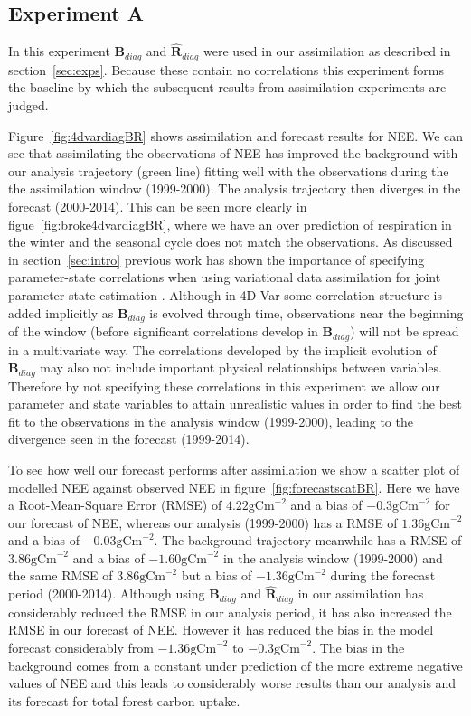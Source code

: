 \documentclass[11pt]{article}
\begin{document}
\subsection{Experiment A} \label{sec:expa}
In this experiment $\textbf{B}_{diag}$ and $\hat{\textbf{R}}_{diag}$ were used in our assimilation as described in section~\ref{sec:exps}. Because these contain no correlations this experiment forms the baseline by which the subsequent results from assimilation experiments are judged.  

Figure~\ref{fig:4dvardiagBR} shows assimilation and forecast results for NEE. We can see that assimilating the observations of NEE has improved the background with our analysis trajectory (green line) fitting well with the observations during the the assimilation window (1999-2000). The analysis trajectory then diverges in the forecast (2000-2014). This can be seen more clearly in figue~\ref{fig:broke4dvardiagBR}, where we have an over prediction of respiration in the winter and the seasonal cycle does not match the observations. As discussed in section~\ref{sec:intro} previous work has shown the importance of specifying parameter-state correlations when using variational data assimilation for joint parameter-state estimation \citep{smith2009variational}. Although in 4D-Var some correlation structure is added implicitly as $\textbf{B}_{diag}$ is evolved through time, observations near the beginning of the window (before significant correlations develop in $\textbf{B}_{diag}$) will not be spread in a multivariate way. The correlations developed by the implicit evolution of $\textbf{B}_{diag}$ may also not include important physical relationships between variables. Therefore by not specifying these correlations in this experiment we allow our parameter and state variables to attain unrealistic values in order to find the best fit to the observations in the analysis window (1999-2000), leading to the divergence seen in the forecast (1999-2014). 

To see how well our forecast performs after assimilation we show a scatter plot of modelled NEE against observed NEE in figure~\ref{fig:forecastscatBR}. Here we have a Root-Mean-Square Error (RMSE) of $4.22 \text{gCm}^{-2}$ and a bias of $-0.3 \text{gCm}^{-2}$ for our forecast of NEE, whereas our analysis (1999-2000) has a RMSE of $1.36 \text{gCm}^{-2}$ and a bias of $-0.03 \text{gCm}^{-2}$. The background trajectory meanwhile has a RMSE of $3.86 \text{gCm}^{-2}$ and a bias of $-1.60 \text{gCm}^{-2}$ in the analysis window (1999-2000) and the same RMSE of $3.86 \text{gCm}^{-2}$ but a bias of $-1.36 \text{gCm}^{-2}$ during the forecast period (2000-2014). Although using $\textbf{B}_{diag}$ and $\hat{\textbf{R}}_{diag}$ in our assimilation has considerably reduced the RMSE in our analysis period, it has also increased the RMSE in our forecast of NEE. However it has reduced the bias in the model forecast considerably from $-1.36 \text{gCm}^{-2}$ to $-0.3 \text{gCm}^{-2}$. The bias in the background comes from a constant under prediction of the more extreme negative values of NEE and this leads to considerably worse results than our analysis and its forecast for total forest carbon uptake. 
\end{document}
